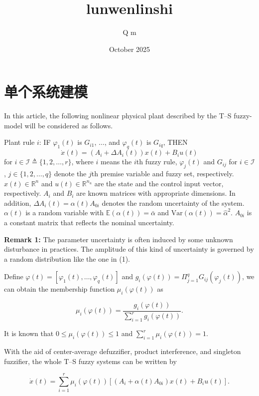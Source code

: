 \documentclass{article}
\title{lunwenlinshi}
\author{Q m}
\date{October 2025}
\begin{document}
\maketitle

\section{单个系统建模}
In this article, the following nonlinear physical plant described by the T–S fuzzy-model will be considered as follows.\

Plant rule $i$: IF $\varphi_1(t)$ is $G_{i1}$, $\ldots$, and $\varphi_q(t)$ is $G_{iq}$, THEN
\begin{equation}
\dot{x}(t) = (A_i + \Delta A_i(t))x(t) + B_i u(t)
\end{equation}
for $i \in \mathcal{I} \triangleq \{1, 2, \ldots, r\}$, where $i$ means the $i$th fuzzy rule, $\varphi_j(t)$ and $G_{ij}$ for $i \in \mathcal{I}$, $j \in \{1, 2, \ldots, q\}$ denote the $j$th premise variable and fuzzy set, respectively. $x(t) \in \mathbb{R}^n$ and $u(t) \in \mathbb{R}^{n_u}$ are the state and the control input vector, respectively. $A_i$ and $B_i$ are known matrices with appropriate dimensions. In addition, $\Delta A_i(t) = \alpha(t)A_{0i}$ denotes the random uncertainty of the system. $\alpha(t)$ is a random variable with $\mathbb{E}(\alpha(t)) = \bar{\alpha}$ and $\mathrm{Var}(\alpha(t)) = \hat{\alpha}^2$. $A_{0i}$ is a constant matrix that reflects the nominal uncertainty.\

\textbf{Remark 1:} The parameter uncertainty is often induced by some unknown disturbance in practices. The amplitude of this kind of uncertainty is governed by a random distribution like the one in (1).

Define $\varphi(t) = [\varphi_1(t), \ldots, \varphi_q(t)]$ and $g_i(\varphi(t)) = \Pi_{j=1}^{q} G_{ij}(\varphi_j(t))$, we can obtain the membership function $\mu_i(\varphi(t))$ as

\begin{equation}
\mu_i(\varphi(t)) = \frac{g_i(\varphi(t))}{\sum_{i=1}^{r} g_i(\varphi(t))}. 
\end{equation}

It is known that $0 \leq \mu_i(\varphi(t)) \leq 1$ and $\sum_{i=1}^{r} \mu_i(\varphi(t)) = 1$.

With the aid of center-average defuzzifier, product interference, and singleton fuzzifier, the whole T--S fuzzy systems can be written by

\begin{equation}
\dot{x}(t) = \sum_{i=1}^{r} \mu_i(\varphi(t))[(A_i + \alpha(t)A_{0i})x(t) + B_i u(t)]. 
\end{equation}
\end{document}
